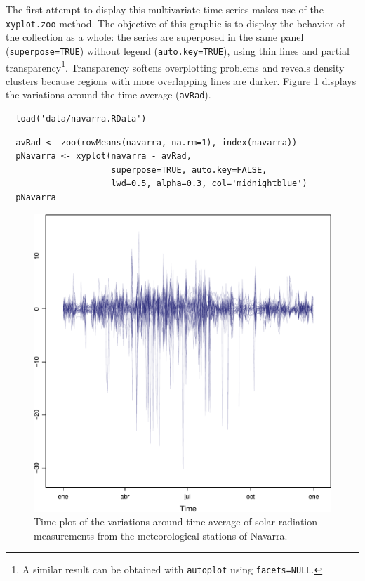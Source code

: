 \documentclass[smallroyalvopaper]{memoir}
\begin{document}
The first attempt to display this multivariate time series makes use
of the \texttt{xyplot.zoo} method. The objective of this graphic is to
display the behavior of the collection as a whole: the series are
superposed in the same panel (\texttt{superpose=TRUE}) without legend
(\texttt{auto.key=TRUE}), using thin lines and partial
transparency\footnote{A similar result can be obtained with \texttt{autoplot} using \texttt{facets=NULL}.}. Transparency softens overplotting problems and reveals
density clusters because regions with more overlapping lines are
darker. Figure \ref{fig:navarraNaive} displays the variations
around the time average (\texttt{avRad}).

\lstset{language=r,label= ,caption= ,captionpos=b,numbers=none}
\begin{lstlisting}
  load('data/navarra.RData')
\end{lstlisting}



\lstset{language=r,label= ,caption= ,captionpos=b,numbers=none}
\begin{lstlisting}
  avRad <- zoo(rowMeans(navarra, na.rm=1), index(navarra))
  pNavarra <- xyplot(navarra - avRad,
                     superpose=TRUE, auto.key=FALSE,
                     lwd=0.5, alpha=0.3, col='midnightblue') 
  pNavarra
\end{lstlisting}

\begin{figure}[htbp]
\centering
\includegraphics[width=.9\linewidth]{figs/navarra.pdf}
\caption{Time plot of the variations around time average of solar radiation measurements from the meteorological stations of Navarra. \label{fig:navarraNaive}}
\end{figure}
\end{document}

